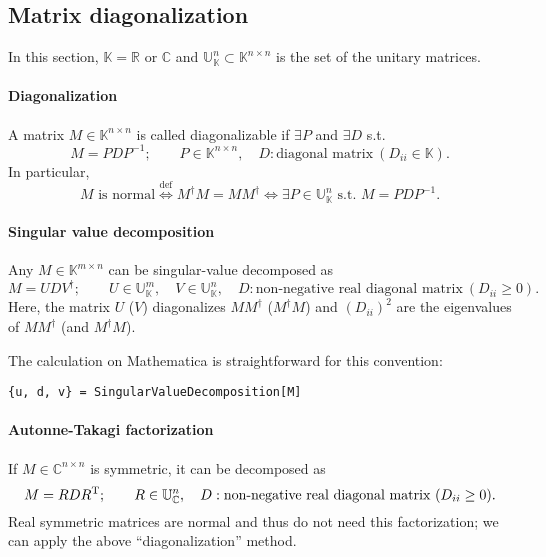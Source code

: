 \documentclass[CheatSheet]{subfiles}
\begin{document}
\subsection{Matrix diagonalization}\label{app:diagonalization}
In this section, $\mathbb K=\mathbb{R}$ or $\mathbb{C}$ and $\mathbb U_{\mathbb K}^{n}\subset \mathbb K^{n\times n}$ is the set of the unitary matrices.

\paragraph{Diagonalization}
A matrix $M\in\mathbb K^{n\times n}$ is called diagonalizable if $\exists P$ and $\exists D$ s.t.
\begin{equation}
 M=PDP^{-1};\qquad
 P\in\mathbb{K}^{n\times n},\quad
 D:\text{diagonal matrix}~(D_{ii}\in\mathbb{K}).
\end{equation}
In particular,
\begin{equation}
 \text{$M$ is normal} \stackrel{\text{def}}\iff M^\dagger M = M M^\dagger \iff
 \exists P\in\mathbb{U}_{\mathbb K}^{n} \text{~s.t.~} M=PDP^{-1}.
\end{equation}


\paragraph{Singular value decomposition}
Any $M\in\mathbb{K}^{m\times n}$ can be singular-value decomposed as
\begin{equation}
 M=UDV^\dagger;\qquad
 U\in\mathbb{U}_{\mathbb K}^m,\quad
 V\in\mathbb{U}_{\mathbb K}^n,\quad
 D: \text{non-negative real diagonal matrix}~(D_{ii}\ge0).
\end{equation}
Here, the matrix $U$ ($V$) diagonalizes $MM^\dagger$ ($M^\dagger M$) and $(D_{ii})^2$ are the eigenvalues of $MM^\dagger$ (and $M^\dagger M$).

The calculation on Mathematica is straightforward for this convention:
\begin{verbatim}
{u, d, v} = SingularValueDecomposition[M]
\end{verbatim}




\paragraph{Autonne-Takagi factorization}
If $M\in\mathbb{C}^{n\times n}$ is symmetric, it can be decomposed as
\begin{equation}
 M=RDR^{\mathrm{T}};\qquad
 R\in\mathbb{U}_{\mathbb C}^n,\quad
 D: \text{non-negative real diagonal matrix}~(D_{ii}\ge0).
 \label{eq:ATF}
\end{equation}
Real symmetric matrices are normal and thus do not need this factorization; we can apply the above ``diagonalization'' method.
\end{document}
